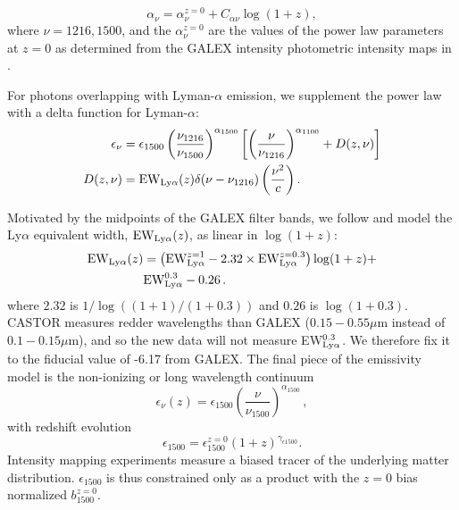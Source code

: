 \documentclass[fleqn,usenatbib]{mnras}
\begin{document}
\begin{equation}
    \alpha_{\nu} = \alpha_{\nu}^{z=0} + C_{\alpha \nu} \log(1+z),
\end{equation}
where $\nu = 1216, 1500$, and the $\alpha_{\nu}^{z=0}$ are the values of the power law parameters at $z = 0$ as determined from the {\small GALEX} intensity photometric intensity maps in \cite{Chiang_2019}. 


For photons overlapping with Lyman-$\alpha$ emission, we supplement the power law with a delta function for Lyman-$\alpha$:
\begin{align}
\label{emiss_912_1216}
\epsilon_{\nu} &= \epsilon_{1500} \left(\frac{\nu_{1216}}{\nu_{1500}}\right)^{\alpha_{1500}}  \left[\left(\frac{\nu}{\nu_{1216}}\right)^{\alpha_{1100}}  + D(z, \nu)\right]\nonumber \\
D(z,\nu) &= {\rm EW}_{\rm Ly\alpha}(z) \delta (\nu - \nu_{1216}) \left(\frac{\nu^2}{c} \right). 
\end{align}

Motivated by the midpoints of the {\small GALEX} filter bands, we follow \cite{Chiang_2019} and model the Ly$\alpha$ equivalent width, ${\rm EW}_{\rm Ly\alpha}(z)$, as linear in $\log(1+z)$:
\begin{align}
    {\rm EW}_{\rm Ly\alpha}(z) &= \left({\rm EW}_{\rm Ly\alpha}^{z=1} - 2.32 \times{\rm EW}_{\rm Ly\alpha}^{z=0.3} \right) \log (1+z) +  \nonumber\\ 
    & {\rm EW}_{\rm Ly\alpha}^{0.3} - 0.26\,.
\end{align}
where $2.32$ is $1/\log((1+1)/(1+0.3))$ and $0.26$ is $\log(1+0.3)$.
{\small CASTOR} measures redder wavelengths than {\small GALEX}  ($0.15-0.55 \mu$m instead of $0.1-0.15 \mu$m), and so the new data will not measure EW$_{\rm Ly\alpha}^{0.3}$. We therefore fix it to the fiducial value of -6.17 from {\small GALEX}. The final piece of the emissivity model is the non-ionizing or long wavelength continuum
\begin{equation}
\label{emiss_1500}
\epsilon_{\nu}(z) = \epsilon_{1500} \left( \frac{\nu}{\nu_{1500}}\right)^{\alpha_{1500}}\,,
\end{equation}
with redshift evolution
\begin{equation}
    \epsilon_{1500} = \epsilon_{1500}^{z=0} (1+z)^{\gamma_{\epsilon 1500}}.
\end{equation}
Intensity mapping experiments measure a biased tracer of the underlying matter distribution. $\epsilon_{1500}$ is thus constrained only as a product with the $z=0$ bias normalized $b_{1500}^{z=0}$. 
\end{document}

